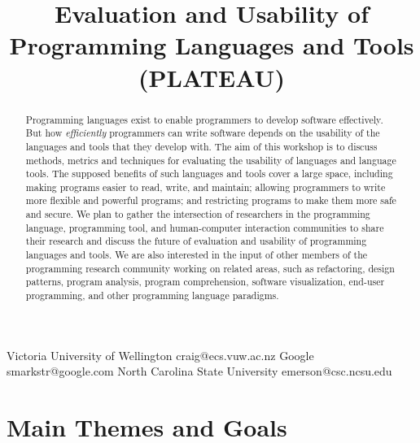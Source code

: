\documentclass[authorpermission]{sigplanconf}
\begin{document}
\title{Evaluation and Usability of Programming Languages and Tools (PLATEAU)}

           {Victoria University of Wellington}
           {craig@ecs.vuw.ac.nz}
           {Google}
           {smarkstr@google.com}      
           {North Carolina State University}
           {emerson@csc.ncsu.edu}
\date{}

\maketitle
\begin{abstract}

  Programming languages exist to enable programmers to develop
  software effectively.  But how \emph{efficiently} programmers can
  write software depends on the usability of the languages and tools
  that they develop with.  The aim of this workshop is to discuss
  methods, metrics and techniques for evaluating the usability of
  languages and language tools.  The supposed benefits of such
  languages and tools cover a large space, including making programs
  easier to read, write, and maintain; allowing programmers to write
  more flexible and powerful programs; and restricting programs to
  make them more safe and secure. We plan to gather the intersection
  of researchers in the programming language, programming tool, and
  human-computer interaction communities to share their research and
  discuss the future of evaluation and usability of programming
  languages and tools. We are also interested in the input of other
  members of the programming research community working on related
  areas, such as refactoring, design patterns, program analysis,
  program comprehension, software visualization, end-user programming,
  and other programming language paradigms.

\end{abstract}





\section{Main Themes and Goals}
\end{document}
